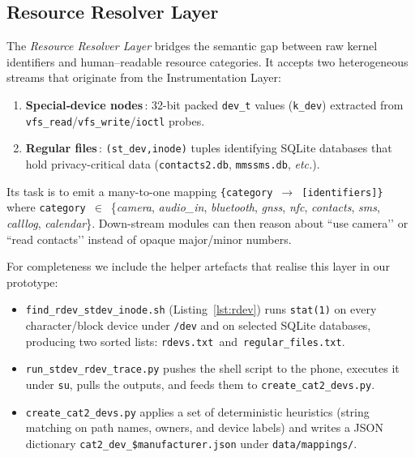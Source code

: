 \documentclass[a4paper,12pt]{report}
\begin{document}
\subsection{Resource Resolver Layer}

The \emph{Resource Resolver Layer} bridges the semantic gap between
raw kernel identifiers and human–readable resource categories.  It
accepts two heterogeneous streams that originate from the
Instrumentation Layer:

\begin{enumerate}
  \item \textbf{Special‐device nodes}\,: 32-bit packed
        \texttt{dev\_t} values (\texttt{k\_dev}) extracted from
        \texttt{vfs\_read}/\texttt{vfs\_write}/\texttt{ioctl} probes.
  \item \textbf{Regular files}\,: \texttt{(st\_dev,\;inode)} tuples
        identifying SQLite databases that hold privacy-critical data
        (\texttt{contacts2.db}, \texttt{mmssms.db}, \textit{etc.}).
\end{enumerate}

Its task is to emit a many-to-one mapping
\texttt{\{category $\rightarrow$ [identifiers]\}} where
\texttt{category}~$\in$~\{\textit{camera}, \textit{audio\_in},
\textit{bluetooth}, \textit{gnss}, \textit{nfc},
\textit{contacts}, \textit{sms}, \textit{calllog},
\textit{calendar}\}.
Down-stream modules can then reason about ``use camera’’ or ``read
contacts’’ instead of opaque major/minor numbers.

For completeness we include the helper artefacts that realise this
layer in our prototype:

\begin{itemize}
  \item \texttt{find\_rdev\_stdev\_inode.sh} (Listing~\ref{lst:rdev})
        runs \texttt{stat(1)} on every character/block device under
        \texttt{/dev} and on selected SQLite databases, producing two
        sorted lists:
        \texttt{rdevs.txt}~and~\texttt{regular\_files.txt}.
  \item \texttt{run\_stdev\_rdev\_trace.py} pushes the shell script to
        the phone, executes it under \texttt{su}, pulls the outputs,
        and feeds them to
        \texttt{create\_cat2\_devs.py}.
  \item \texttt{create\_cat2\_devs.py} applies a set of deterministic
        heuristics (string matching on path names, owners, and device
        labels) and writes a JSON dictionary
        \texttt{cat2\_dev\_\$manufacturer.json} under
        \texttt{data/mappings/}.
\end{itemize}
\end{document}
